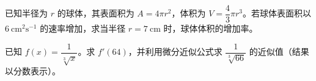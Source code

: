 \documentclass[12pt,a4paper]{exam-zh}
\newcommand{\qscore}[1]{%
    \unskip\nobreak\hfill
    \makebox[0pt][l]{\makebox[4em][r]{(#1\%)}}%
}
\begin{document}
\begin{question}[points = 10]
    \begin{questionparts}
        \item 已知半径为 $r$ 的球体，其表面积为 $A = 4\pi r^2$，体积为 $V = \dfrac{4}{3}\pi r^3$。若球体表面积以 $6\ \text{cm}^2\text{s}^{-1}$ 的速率增加，求当半径 $r = 7\ \text{cm}$ 时，球体体积的增加率。 \qscore{4}

        \item 已知 $f(x) = \dfrac{1}{\sqrt[3]{x}}$。求 $f'(64)$，并利用微分近似公式求 $\dfrac{1}{\sqrt[3]{66}}$ 的近似值（结果以分数表示）。 \qscore{5}
    \end{questionparts}
\end{question}
\end{document}
